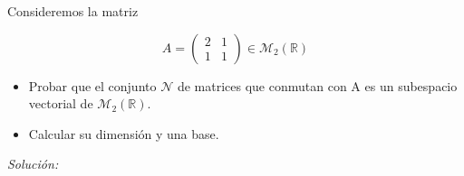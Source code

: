 \question Consideremos la matriz

\begin{equation*}
    A =
    \begin{pmatrix}
        2 & 1 \\
        1 & 1
    \end{pmatrix}
    \in
    \mathcal{M}_2(\mathbb{R})
\end{equation*}

\begin{itemize}[$\bullet$]
    \item Probar que el conjunto $\mathcal{N}$ de matrices que conmutan con A es un subespacio vectorial de $\mathcal{M}_2(\mathbb{R})$.
    \item Calcular su dimensión y una base.
\end{itemize}

\vspace{20px}
\textit{Solución:}

